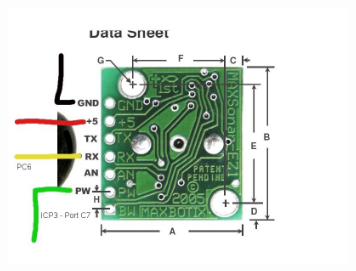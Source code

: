   \begin{center}
    \includegraphics[width=90mm]{imageSources/sonarConnect.png}
  \end{center}
  \label{sonarConnect}


